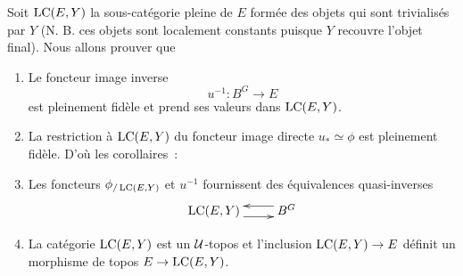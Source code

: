 Soit $\operatorname{LC}(E, Y)$ la sous-catégorie pleine de $E$ formée des objets qui sont trivialisés par $Y$ (N. B. ces objets sont localement constants puisque $Y$ recouvre l'objet final). Nous allons prouver que
\begin{enumerate}
    \item[(i)] Le foncteur image inverse
    $$
    u^{-1}: B^G \to E
    $$
    est pleinement fidèle et prend ses valeurs dans $\operatorname{LC}(E, Y)$.
    \item[(ii)] La restriction à $\operatorname{LC}(E, Y)$ du foncteur image directe $u_*\simeq\phi$ est pleinement fidèle.
    D'où les corollaires~:
    \item[(iii)] Les foncteurs $\phi_{/\operatorname{LC}(E, Y)}$ et $u^{-1}$ fournissent des équivalences quasi-inverses
    $$
    \xymatrix{ \LC(E,Y) \ar@<-1ex>[r]  & \ar@<-1ex>[l] B^G}
    $$
    \item[(iv)] La catégorie $\operatorname{LC}(E, Y)$ est un ${\cal U}$-topos et l'inclusion $\operatorname{LC}(E, Y) \to E$ définit un morphisme de topos $E \to \operatorname{LC}(E, Y)$.
\end{enumerate}


